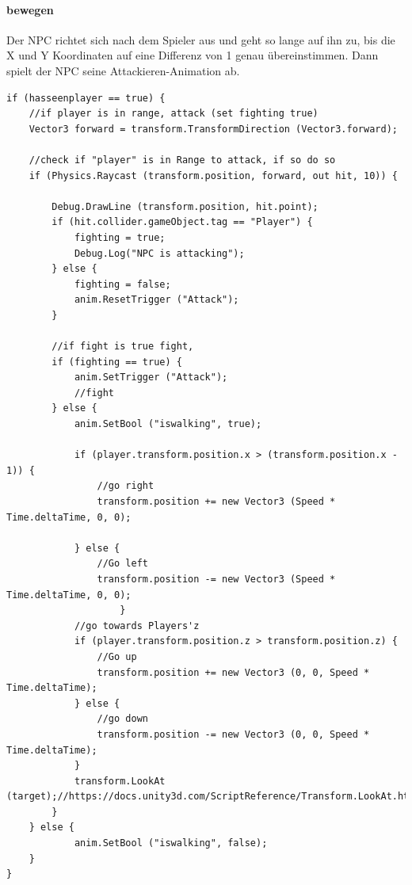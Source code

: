 \paragraph{bewegen }
Der NPC richtet sich nach dem Spieler aus und geht so lange auf ihn zu, bis die X und Y Koordinaten auf eine Differenz von 1 genau übereinstimmen.
Dann spielt der NPC seine Attackieren-Animation ab.
\begin{lstlisting}
if (hasseenplayer == true) {	
	//if player is in range, attack (set fighting true)
	Vector3 forward = transform.TransformDirection (Vector3.forward);

	//check if "player" is in Range to attack, if so do so
	if (Physics.Raycast (transform.position, forward, out hit, 10)) {	

		Debug.DrawLine (transform.position, hit.point);
		if (hit.collider.gameObject.tag == "Player") {
			fighting = true;
			Debug.Log("NPC is attacking");
		} else {
			fighting = false;
			anim.ResetTrigger ("Attack");
		}

		//if fight is true fight,
		if (fighting == true) {
			anim.SetTrigger ("Attack");
			//fight
		} else {	
			anim.SetBool ("iswalking", true);
					
			if (player.transform.position.x > (transform.position.x - 1)) {
				//go right
				transform.position += new Vector3 (Speed * Time.deltaTime, 0, 0);
            		
			} else {
				//Go left
				transform.position -= new Vector3 (Speed * Time.deltaTime, 0, 0);
					}
			//go towards Players'z
			if (player.transform.position.z > transform.position.z) {
				//Go up
				transform.position += new Vector3 (0, 0, Speed * Time.deltaTime);
			} else {
				//go down
				transform.position -= new Vector3 (0, 0, Speed * Time.deltaTime);
			}
			transform.LookAt (target);//https://docs.unity3d.com/ScriptReference/Transform.LookAt.html
		}
	} else {
			anim.SetBool ("iswalking", false);
	}
}

\end{lstlisting}
